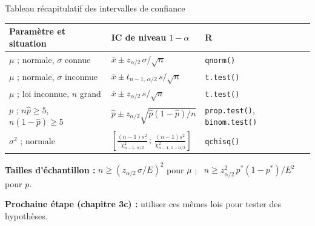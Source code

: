 \documentclass{BeamerTemplate}
\begin{document}
\begin{frame}[t]{Tableau récapitulatif des intervalles de confiance}
  \centering
  \footnotesize
  \renewcommand{\arraystretch}{1.6}
  \begin{tabular}{lll}\toprule
    \textbf{Paramètre et situation} & \textbf{IC de niveau $1-\alpha$} & \textbf{R} \\ \midrule
    $\mu$ ; normale, $\sigma$ connue & $\bar{x} \pm z_{\alpha/2}\,\sigma/\sqrt{n}$ & \texttt{qnorm()} \\
    $\mu$ ; normale, $\sigma$ inconnue & $\bar{x} \pm t_{n-1,\,\alpha/2}\,s/\sqrt{n}$ & \texttt{t.test()} \\
    $\mu$ ; loi inconnue, $n$ grand & $\bar{x} \pm z_{\alpha/2}\,s/\sqrt{n}$ & \texttt{t.test()}\\
    $p$ ; $n\hat{p} \ge 5$, $n(1-\hat{p}) \ge 5$ & $\hat{p} \pm z_{\alpha/2}\sqrt{\hat{p}(1-\hat{p})/n}$ & \texttt{prop.test()}, \texttt{binom.test()} \\
    $\sigma^2$ ; normale & $\left[\frac{(n-1)s^2}{\chi^2_{n-1,\,\alpha/2}} \,;\, \frac{(n-1)s^2}{\chi^2_{n-1,\,1-\alpha/2}}\right]$ & \texttt{qchisq()} \\ \bottomrule
  \end{tabular}

  \raggedright
  \medskip
  \textbf{Tailles d'échantillon :} $n \ge (z_{\alpha/2}\,\sigma/E)^2$ pour $\mu$ ; \ $n \ge z_{\alpha/2}^2\,p^*(1-p^*)/E^2$ pour $p$.

  \medskip
  \textbf{Prochaine étape (chapitre 3c) :} utiliser ces mêmes lois pour \alert{tester des hypothèses}.
\end{frame}
\end{document}
